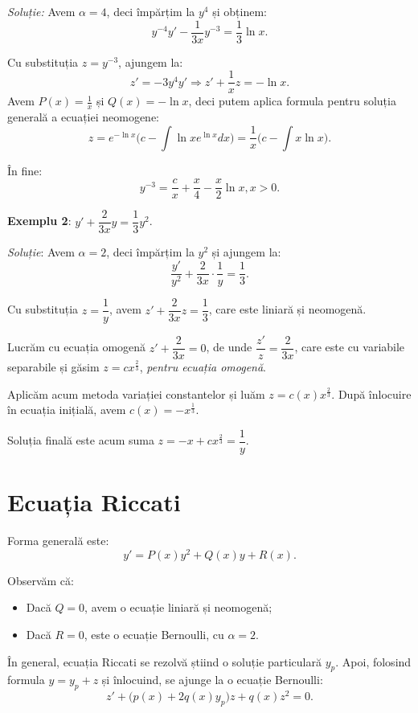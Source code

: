 \emph{Soluție:} Avem $\alpha = 4$, deci împărțim la $y^4$ și obținem:
\[
  y^{-4} y' - \frac{1}{3x} y^{-3} = \frac{1}{3} \ln x.
\]

Cu substituția $z = y^{-3}$, ajungem la:
\[
  z' = - 3y^4 y' \Rightarrow z' + \frac{1}{x} z = -\ln x.
\]
Avem $P(x) = \frac{1}{x}$ și $Q(x) = -\ln x$, deci putem aplica formula pentru
soluția generală a ecuației neomogene:
\[
  z = e^{-\ln x} \Big( c - \int \ln x e^{\ln x} dx \Big) = \frac{1}{x} \Big( c - \int x \ln x \Big).
\]

În fine:
\[
  y^{-3} = \frac{c}{x} + \frac{x}{4} - \frac{x}{2} \ln x, x > 0.
\]

\vspace{0.5cm}

\textbf{Exemplu 2}: $y' + \dfrac{2}{3x}y = \dfrac{1}{3} y^2$.

\emph{Soluție}: Avem $\alpha = 2$, deci împărțim la $y^2$ și ajungem la:
\[
  \frac{y'}{y^2} + \frac{2}{3x} \cdot \frac{1}{y} = \frac{1}{3}.
\]

Cu substituția $z = \dfrac{1}{y}$, avem $z' + \dfrac{2}{3x} z = \dfrac{1}{3}$,
care este liniară și neomogenă.

Lucrăm cu ecuația omogenă $z' + \dfrac{2}{3x} = 0$, de unde $\dfrac{z'}{z} = \dfrac{2}{3x}$,
care este cu variabile separabile și găsim $z = cx^{\frac{2}{3}}$, \emph{pentru ecuația omogenă}.

Aplicăm acum metoda variației constantelor și luăm $z = c(x) x^{\frac{2}{3}}$. După înlocuire
în ecuația inițială, avem $c(x) = -x^{\frac{1}{3}}$.

Soluția finală este acum suma $z = -x + cx^{\frac{2}{3}} = \dfrac{1}{y}$.


\section{Ecuația Riccati}
\label{sec:ec-ric}

Forma generală este:
\[
  y' = P(x) y^2 + Q(x) y + R(x).
\]

Observăm că:
\begin{itemize}
\item Dacă $Q = 0$, avem o ecuație liniară și neomogenă;
\item Dacă $R = 0$, este o ecuație Bernoulli, cu $\alpha = 2$.
\end{itemize}
  
În general, ecuația Riccati se rezolvă știind o soluție particulară $y_p$. Apoi,
folosind formula $y = y_p + z$ și înlocuind, se ajunge la o ecuație Bernoulli:
\[
  z' + \big(p(x) + 2q(x) y_p\big)z + q(x) z^2 = 0.
\]

